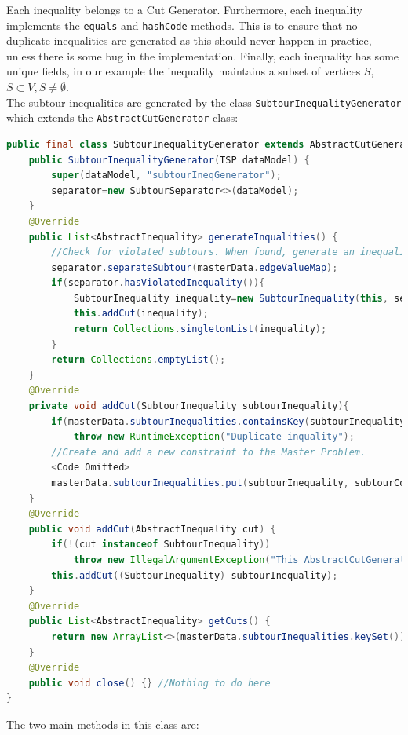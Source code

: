 \documentclass[a4paper]{article}
\newenvironment{myblock}[1]{%
    \tcolorbox[beamer,%
    noparskip,breakable,
    colback=lightBlueCodeBlock,colframe=darkBlueCodeBlock,%
    colbacklower=darkBlueCodeBlock!75!lightBlueCodeBlock,%
    coltitle=blueTitleCodeBlock,
    title=#1]}%
    {\endtcolorbox}
\newcommand{\code}[1]{\lstinline[language=java, style=seminar]!#1!}
\begin{document}
Each inequality belongs to a Cut Generator. Furthermore, each inequality implements the \code{equals} and \code{hashCode} methods. This is to ensure that no duplicate inequalities are generated as this should never happen in practice, unless there is some bug in the implementation. Finally, each inequality has some unique fields, in our example the inequality maintains a subset of vertices $S$, $S\subset V, S\neq \emptyset$.\\
The subtour inequalities are generated by the class \code{SubtourInequalityGenerator} which extends the \code{AbstractCutGenerator} class:
\begin{myblock}{SubtourInequalityGenerator}
\begin{lstlisting}[language=java, style=eclipseArticle, xleftmargin=2em]  
public final class SubtourInequalityGenerator extends AbstractCutGenerator<TSP, TSPMasterData> {
	public SubtourInequalityGenerator(TSP dataModel) {
		super(dataModel, "subtourIneqGenerator");
		separator=new SubtourSeparator<>(dataModel);
	}
	@Override
	public List<AbstractInequality> generateInqualities() {
		//Check for violated subtours. When found, generate an inequality
		separator.separateSubtour(masterData.edgeValueMap);
		if(separator.hasViolatedInequality()){
			SubtourInequality inequality=new SubtourInequality(this, separator.getVertexSubSet());
			this.addCut(inequality);
			return Collections.singletonList(inequality);
		}
		return Collections.emptyList();
	}
	@Override
	private void addCut(SubtourInequality subtourInequality){
		if(masterData.subtourInequalities.containsKey(subtourInequality))
			throw new RuntimeException("Duplicate inquality");
		//Create and add a new constraint to the Master Problem.
		<Code Omitted>
		masterData.subtourInequalities.put(subtourInequality, subtourConstraintForMaster);
	}
	@Override
	public void addCut(AbstractInequality cut) {
		if(!(cut instanceof SubtourInequality))
			throw new IllegalArgumentException("This AbstractCutGenerator can ONLY add SubtourInequalities");
		this.addCut((SubtourInequality) subtourInequality);
	}
	@Override
	public List<AbstractInequality> getCuts() {
		return new ArrayList<>(masterData.subtourInequalities.keySet());
	}
	@Override
	public void close() {} //Nothing to do here
}
\end{lstlisting}
\end{myblock}
The two main methods in this class are:
\end{document}

